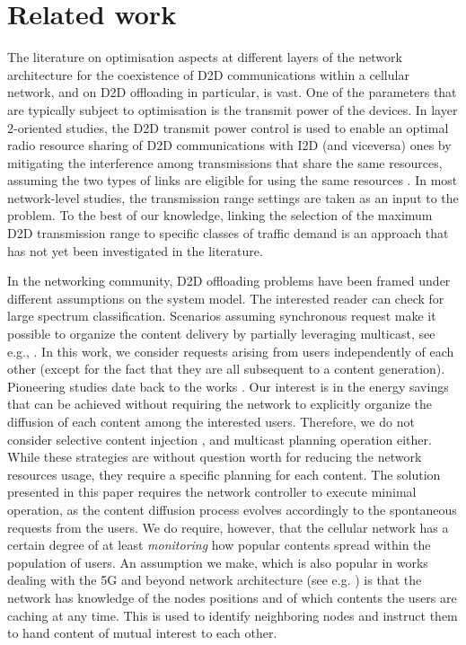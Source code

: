 \section{Related work\label{sec:Related-work}
}

The literature on optimisation aspects at different layers of the
network architecture for the coexistence of D2D communications within
a cellular network, and on D2D offloading in particular, is vast.
One of the parameters that are typically subject to optimisation is
the transmit power of the devices. In layer 2-oriented studies, the
D2D transmit power control is used to enable an optimal radio resource
sharing of D2D communications with I2D (and viceversa) ones by mitigating
the interference among transmissions that share the same resources,
assuming the two types of links are eligible for using the same resources
\cite{Doppler2009,Yu2009}. In most network-level studies, the transmission
range settings are taken as an input to the problem. To the best of
our knowledge, linking the selection of the maximum D2D transmission
range to specific classes of traffic demand is an approach that has
not yet been investigated in the literature.

In the networking community, D2D offloading problems have been framed
under different assumptions on the system model. The interested reader
can check \cite{Rebecchi2015} for large spectrum classification.
Scenarios assuming synchronous request make it possible to organize
the content delivery by partially leveraging multicast, see e.g.,
\cite{Rebecchi2015b}. In this work, we consider requests arising
from users independently of each other (except for the fact that they
are all subsequent to a content generation). Pioneering studies date
back to the works \cite{Whitbeck2011,Whitbeck2012}. Our interest
is in the energy savings that can be achieved without requiring the
network to explicitly organize the diffusion of each content among
the interested users. Therefore, we do not consider selective content
injection \cite{Rebecchi2016,Sciancalepore2016}, and multicast planning
operation either. While these strategies are without question worth
for reducing the network resources usage, they require a specific
planning for each content. The solution presented in this paper requires
the network controller to execute minimal operation, as the content
diffusion process evolves accordingly to the spontaneous requests
from the users. We do require, however, that the cellular network
has a certain degree of at least \emph{monitoring} how popular contents
spread within the population of users. An assumption we make, which
is also popular in works dealing with the 5G and beyond network architecture
(see e.g. \cite{Lee2020}) is that the network has knowledge of the
nodes positions and of which contents the users are caching at any
time. This is used to identify neighboring nodes and instruct them
to hand content of mutual interest to each other.

